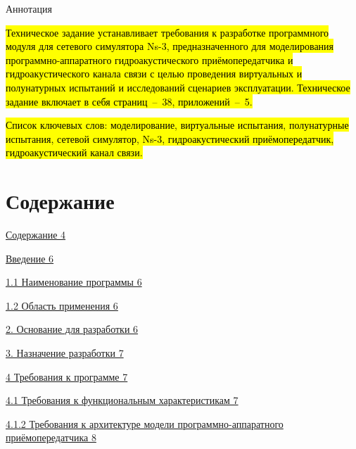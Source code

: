 Аннотация

\hl{Техническое задание устанавливает требования к разработке
программного модуля для сетевого симулятора Ns-3, предназначенного для
моделирования программно-аппаратного гидроакустического
приёмопередатчика и гидроакустического канала связи с целью проведения
виртуальных и полунатурных испытаний и исследований сценариев
эксплуатации. Техническое задание включает в себя страниц~--~38,
приложений~--~5.}

\hl{Список ключевых слов: моделирование, виртуальные испытания,
полунатурные испытания, сетевой симулятор, Ns-3, гидроакустический
приёмопередатчик, гидроакустический канал связи.\\
}

\section{Содержание}\label{ux441ux43eux434ux435ux440ux436ux430ux43dux438ux435}

\hyperref[ux432ux432ux435ux434ux435ux43dux438ux435]{Содержание 4}

\hyperref[ux432ux432ux435ux434ux435ux43dux438ux435]{Введение 6}

\hyperref[ux43dux430ux438ux43cux435ux43dux43eux432ux430ux43dux438ux435-ux43fux440ux43eux433ux440ux430ux43cux43cux44b]{1.1
Наименование программы 6}

\hyperref[ux43eux431ux43bux430ux441ux442ux44c-ux43fux440ux438ux43cux435ux43dux435ux43dux438ux44f]{1.2
Область применения 6}

\hyperref[ux43eux441ux43dux43eux432ux430ux43dux438ux435-ux434ux43bux44f-ux440ux430ux437ux440ux430ux431ux43eux442ux43aux438]{2.
Основание для разработки 6}

\hyperref[ux43dux430ux437ux43dux430ux447ux435ux43dux438ux435-ux440ux430ux437ux440ux430ux431ux43eux442ux43aux438]{3.
Назначение разработки 7}

\hyperref[ux442ux440ux435ux431ux43eux432ux430ux43dux438ux44f-ux43a-ux43fux440ux43eux433ux440ux430ux43cux43cux435]{4
Требования к программе 7}

\hyperref[ux442ux440ux435ux431ux43eux432ux430ux43dux438ux44f-ux43a-ux444ux443ux43dux43aux446ux438ux43eux43dux430ux43bux44cux43dux44bux43c-ux445ux430ux440ux430ux43aux442ux435ux440ux438ux441ux442ux438ux43aux430ux43c]{4.1
Требования к функциональным характеристикам 7}

\hyperref[ux442ux440ux435ux431ux43eux432ux430ux43dux438ux44f-ux43a-ux430ux440ux445ux438ux442ux435ux43aux442ux443ux440ux435-ux43cux43eux434ux435ux43bux438-ux43fux440ux43eux433ux440ux430ux43cux43cux43dux43e-ux430ux43fux43fux430ux440ux430ux442ux43dux43eux433ux43e-ux43fux440ux438ux451ux43cux43eux43fux435ux440ux435ux434ux430ux442ux447ux438ux43aux430]{4.1.2
Требования к архитектуре модели программно-аппаратного приёмопередатчика
8}

